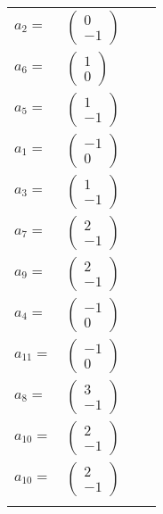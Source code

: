 \documentclass[1p]{elsarticle_modified}
\theoremstyle{definition}
\begin{document}
\begin{tabular}{m{7pt} m{180pt} m{7pt} m{180pt} }
\flushright $a_{2}=$&$\begin{pmatrix}0\\-1\end{pmatrix}$ \\
\flushright $a_{6}=$&$\begin{pmatrix}1\\0\end{pmatrix}$ \\
\flushright $a_{5}=$&$\begin{pmatrix}1\\-1\end{pmatrix}$ \\
\flushright $a_{1}=$&$\begin{pmatrix}-1\\0\end{pmatrix}$ \\
\flushright $a_{3}=$&$\begin{pmatrix}1\\-1\end{pmatrix}$ \\
\flushright $a_{7}=$&$\begin{pmatrix}2\\-1\end{pmatrix}$ \\
\flushright $a_{9}=$&$\begin{pmatrix}2\\-1\end{pmatrix}$ \\
\flushright $a_{4}=$&$\begin{pmatrix}-1\\0\end{pmatrix}$ \\
\flushright $a_{11}=$&$\begin{pmatrix}-1\\0\end{pmatrix}$ \\
\flushright $a_{8}=$&$\begin{pmatrix}3\\-1\end{pmatrix}$ \\
\flushright $a_{10}=$&$\begin{pmatrix}2\\-1\end{pmatrix}$\\ \flushright $a_{10}=$&$\begin{pmatrix}2\\-1\end{pmatrix}$\\&\end{tabular}
\end{document}
